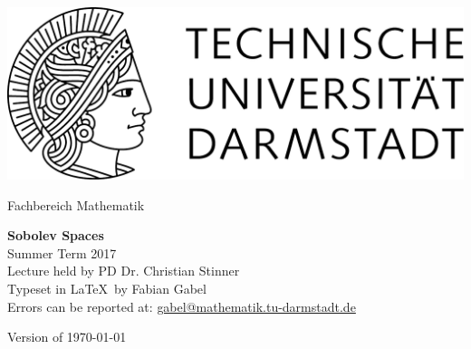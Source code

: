 \documentclass[11pt,a4paper,leqno]{report}
\begin{document}
\hypersetup{pageanchor=false}
\begin{titlepage}
  \begin{center}
    \vspace{1cm}
    \includegraphics[width=0.5\linewidth]{TU_Darmstadt_Logo.pdf}
    \vspace{1cm}
    
    \large{Fachbereich Mathematik}
    \vspace{3.5cm}
    
    \Huge{\textbf{Sobolev Spaces}\\}
    \vspace*{0.5cm}    
    \Large{{Summer Term 2017}\\}
    \vspace*{0.5cm}    
    \small{Lecture held by PD Dr. Christian Stinner\\}
    \vspace*{1.0cm}
    \small{Typeset in \LaTeX\ by Fabian Gabel\\}
    \small{Errors can be reported at: \url{gabel@mathematik.tu-darmstadt.de}}

    \vspace*{\fill}
    \small{Version of \today}
  \end{center}
\end{titlepage}

\hypersetup{pageanchor=true}
\tableofcontents









\end{document}
